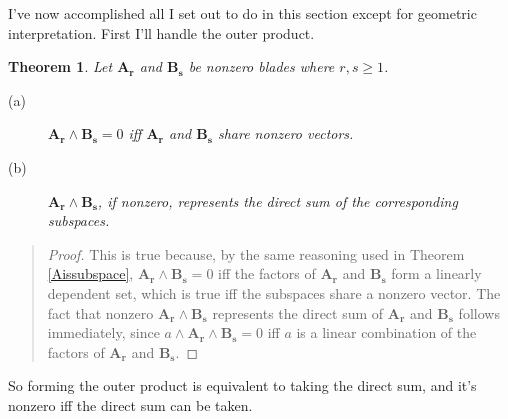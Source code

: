 \documentclass{utarticle}
\newcommand{\bl}[1]{\ensuremath{\bm{#1}}}
\DeclareMathOperator{\out}{\wedge}
\newtheorem{thm}{Theorem}
\newcommand{\bp}{\begin{quotation} \begin{proof}}
\newcommand{\ep}{\end{proof} \end{quotation}}
\begin{document}
I've now accomplished all I set out to do in this section except for geometric interpretation.
First I'll handle the outer product.
\begin{thm}
Let \bl{A_r} and \bl{B_s} be nonzero blades where $r, s \geq 1$.
\begin{description}
\item[(a)] $\bl{A_r} \out \bl{B_s} = 0$ iff \bl{A_r} and \bl{B_s} share nonzero vectors.
\item[(b)] $\bl{A_r} \out \bl{B_s}$, if nonzero, represents the direct sum of the 
      corresponding subspaces.
\end{description}
\label{outerprodmean}
\end{thm}
\bp
This is true because, by the same reasoning used in Theorem \ref{Aissubspace}, 
$\bl{A_r} \out \bl{B_s} = 0$ iff the factors 
of \bl{A_r} and \bl{B_s} form a linearly dependent set, which is true iff the 
subspaces share a nonzero vector.  The fact that nonzero $\bl{A_r} \out \bl{B_s}$ 
represents the direct sum of \bl{A_r} and \bl{B_s} follows immediately, since
$a \out \bl{A_r} \out \bl{B_s} = 0$ iff $a$ is a linear combination of the 
factors of \bl{A_r} and \bl{B_s}.
\ep
So forming the outer product is equivalent to taking the direct sum, and it's nonzero iff
the direct sum can be taken.
\end{document}
